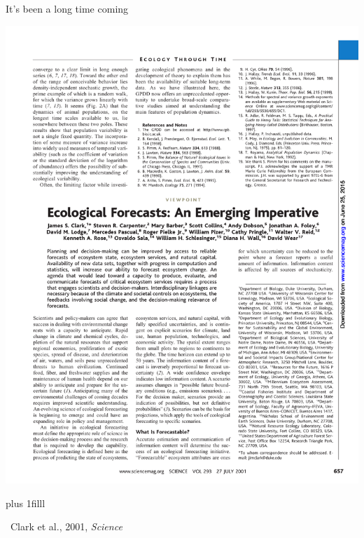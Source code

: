 \documentclass[14pt, compress, aspectratio=1610]{beamer}
\newcommand{\btVFill}{\vskip0pt plus 1filll}
\newcommand{\credit}[1]{\btVFill\par\hfill \footnotesize ~#1}
\begin{document}
\begin{frame}{%
\protect\hypertarget{its-been-a-long-time-coming}{%
It’s been a long time coming}}

\includegraphics[width=\textwidth]{./figures/clark_title.pdf}

\credit{Clark et al., 2001, \emph{Science}}

\end{frame}
\end{document}
